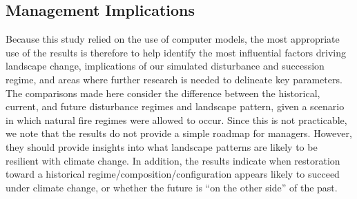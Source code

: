 \documentclass[12pt]{article}
\begin{document}
\begin{spacing}{1}


\subsection*{Management Implications}
Because this study relied on the use of computer models, the most appropriate use of the results is therefore to help identify the most influential factors driving landscape change, implications of our simulated disturbance and succession regime, and areas where further research is needed to delineate key parameters. The comparisons made here consider the difference between the historical, current, and future disturbance regimes and landscape pattern, given a scenario in which natural fire regimes were allowed to occur. Since this is not practicable, we note that the results do not provide a simple roadmap for managers. However, they should provide insights into what landscape patterns are likely to be resilient with climate change. In addition, the results indicate when restoration toward a historical regime/composition/configuration appears likely to succeed under climate change, or whether the future is ``on the other side'' of the past. 




\end{spacing}
\end{document}
